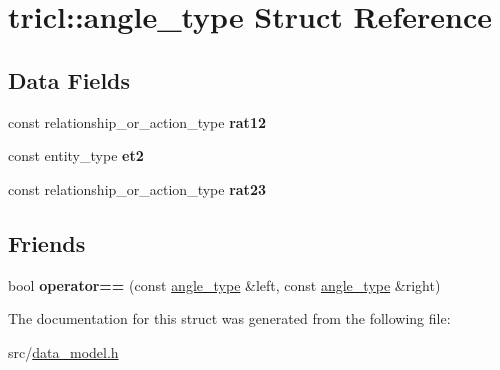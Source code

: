 \hypertarget{structtricl_1_1angle__type}{}\section{tricl\+:\+:angle\+\_\+type Struct Reference}
\label{structtricl_1_1angle__type}
\subsection*{Data Fields}
\begin{DoxyCompactItemize}
\item 
\mbox{\label{structtricl_1_1angle__type_a3a134c76bb8582d630926496752bc0fd}} 
const relationship\+\_\+or\+\_\+action\+\_\+type {\bfseries rat12}
\item 
\mbox{\label{structtricl_1_1angle__type_a8d5d064234bac5aa4cd39fcec34b2fb4}} 
const entity\+\_\+type {\bfseries et2}
\item 
\mbox{\label{structtricl_1_1angle__type_a9a483aa66824f455a89d06a454e5b1b7}} 
const relationship\+\_\+or\+\_\+action\+\_\+type {\bfseries rat23}
\end{DoxyCompactItemize}
\subsection*{Friends}
\begin{DoxyCompactItemize}
\item 
\mbox{\label{structtricl_1_1angle__type_a259cbf4e32421b1e65066025fa86e999}} 
bool {\bfseries operator==} (const \hyperlink{structtricl_1_1angle__type}{angle\+\_\+type} \&left, const \hyperlink{structtricl_1_1angle__type}{angle\+\_\+type} \&right)
\end{DoxyCompactItemize}


The documentation for this struct was generated from the following file\+:\begin{DoxyCompactItemize}
\item 
src/\hyperlink{data__model_8h}{data\+\_\+model.\+h}\end{DoxyCompactItemize}
